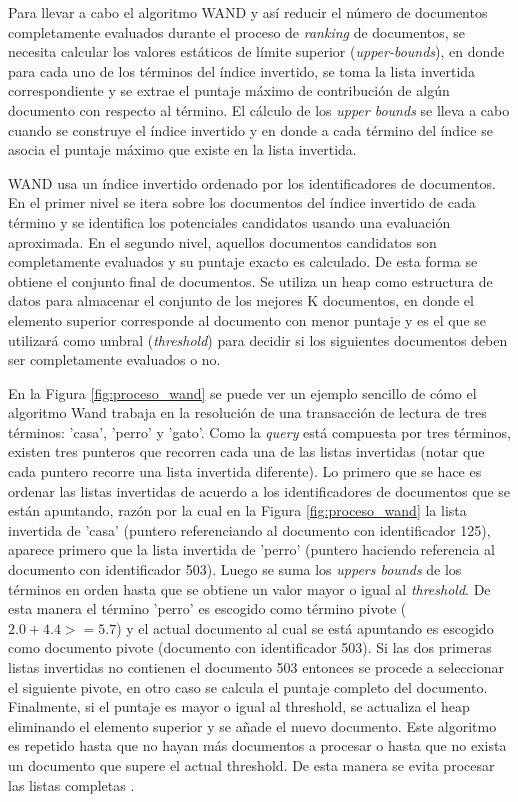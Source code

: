 Para llevar a cabo el algoritmo WAND y así reducir el número de documentos completamente evaluados durante el proceso de \textit{ranking} de documentos, se necesita calcular los valores estáticos de límite superior (\textit{upper-bounds}), en donde para cada uno de los términos del índice invertido, se toma la lista invertida correspondiente y se extrae el puntaje máximo de contribución de algún documento con respecto al término. El cálculo de los \textit{upper bounds} se lleva a cabo cuando se construye el índice invertido y en donde a cada término del índice se asocia el puntaje máximo que existe en la lista invertida. 

WAND usa un índice invertido ordenado por los identificadores de documentos. En el primer nivel se itera sobre los documentos del índice invertido de cada término y se identifica los potenciales candidatos usando una evaluación aproximada. En el segundo nivel, aquellos documentos candidatos son completamente evaluados y su puntaje exacto es calculado. De esta forma se obtiene el conjunto final de documentos. Se utiliza un heap como estructura de datos para almacenar el conjunto de los mejores K documentos, en donde el elemento superior corresponde al documento con menor puntaje y es el que se utilizará como umbral (\textit{threshold}) para decidir si los siguientes documentos deben ser completamente evaluados o no. 

En la Figura \ref{fig:proceso_wand} se puede ver un ejemplo sencillo de cómo el algoritmo Wand trabaja en la resolución de una transacción de lectura de tres términos: 'casa', 'perro' y 'gato'. Como la \textit{query} está compuesta por tres términos, existen tres punteros que recorren cada una de las listas invertidas (notar que cada puntero recorre una lista invertida diferente). Lo primero que se hace es ordenar las listas invertidas de acuerdo a los identificadores de documentos que se están apuntando, razón por la cual en la Figura \ref{fig:proceso_wand} la lista invertida de 'casa' (puntero referenciando al documento con identificador 125), aparece primero que la lista invertida de 'perro' (puntero haciendo referencia al documento con identificador 503). Luego se suma los \textit{uppers bounds} de los términos en orden hasta que se obtiene un valor mayor o igual al \textit{threshold}. De esta manera el término 'perro' es escogido como término pivote ($2.0 + 4.4 >= 5.7$) y el actual documento al cual se está apuntando es escogido como documento pivote (documento con identificador 503). Si las dos primeras listas invertidas no contienen el documento 503 entonces se procede a seleccionar el siguiente pivote, en otro caso se calcula el puntaje completo del documento. Finalmente, si el puntaje es mayor o igual al threshold, se actualiza el heap eliminando el elemento superior y se añade el nuevo documento. 
Este algoritmo es repetido hasta que no hayan más documentos a procesar o hasta que no exista un documento que supere el actual threshold. De esta manera se evita procesar las listas completas \citep{Blanco:2010}.

